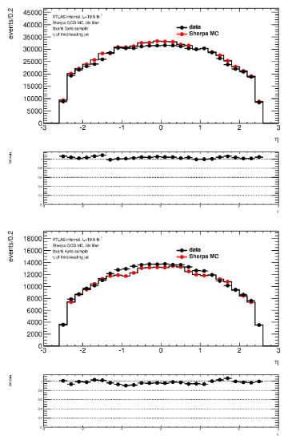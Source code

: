 \begin{figure}[phtb!]
\begin{center}
  \begin{subfigure}[$bbanti$ 3 jet category]{0.3\textwidth}\includegraphics[width=\textwidth]{MonteCarlo/figures/eta2_bbanti_3jets.eps}\end{subfigure}
  \begin{subfigure}[$bbanti$ 4 jet category]{0.3\textwidth}\includegraphics[width=\textwidth]{MonteCarlo/figures/eta2_bbanti_4jets.eps}\end{subfigure}

\end{center}
\end{figure}
